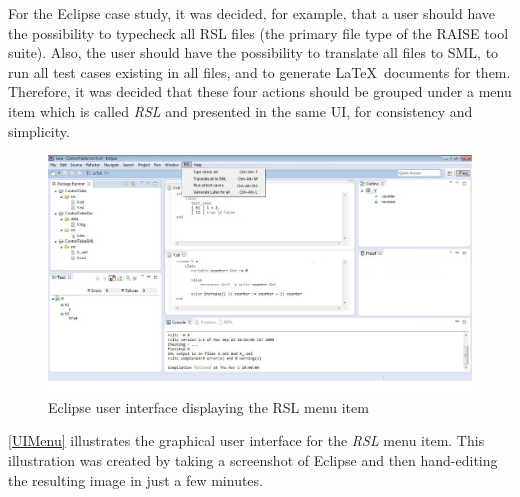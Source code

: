\documentclass[conference]{IEEEtran}
\begin{document}
For the Eclipse case study, it was decided, for example, that a user
should have the possibility to typecheck all RSL files (the primary
file type of the RAISE tool suite). Also, the user should have the
possibility to translate all files to SML, to run all test cases
existing in all files, and to generate \LaTeX\ documents for them.
Therefore, it was decided that these four actions should be grouped
under a menu item which is called \emph{RSL} and presented in the same
UI, for consistency and simplicity.


\begin{figure}[ht!] \centering
\includegraphics[width=7in]{RSLMenu.jpeg} 
\caption{Eclipse user interface displaying the RSL menu item} 
\label{UIMenu} 
\end{figure}



\autoref{UIMenu} illustrates the graphical user interface for the
\emph{RSL} menu item.  This illustration was created by taking a
screenshot of Eclipse and then hand-editing the resulting image in
just a few minutes.
\end{document}
